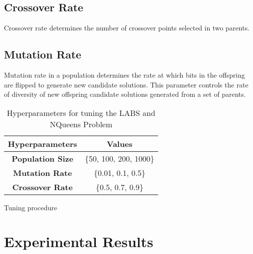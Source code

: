 \documentclass{article}
\begin{document}
\subsection{Crossover Rate}
Crossover rate determines the number of crossover points selected in two parents.  

\subsection{Mutation Rate}
Mutation rate in a population determines the rate at which bits in the offspring are flipped to generate new candidate solutions. This parameter controls the rate of diversity of new offspring candidate solutions generated from a set of parents.  



\begin{table}[h!]
    \centering
    \begin{tabular}{c|c}
        \textbf{Hyperparameters} & \textbf{Values}  \\ \hline
        \textbf{Population Size} & \{50, 100, 200, 1000\}  \\ \hline
        \textbf{Mutation Rate}   & \{0.01, 0.1, 0.5\} \\ 
        \textbf{Crossover Rate}  & \{0.5, 0.7, 0.9\} \\
    \end{tabular}
    \caption{Hyperparameters for tuning the LABS and NQueens Problem}
    \label{tab:my_label}
\end{table}


\begin{algorithm}[!ht]
\SetAlgoLined
{}

\BlankLine

\caption{Tuning procedure}\label{al:tuning}
\end{algorithm}

\section{Experimental Results}\label{sec:experi}

\end{document}
